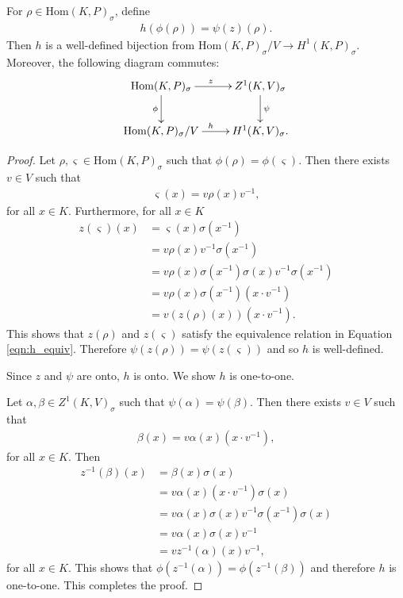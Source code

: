 \begin{lemma} \label{maph}
For $\rho \in \mathrm{Hom}(K, P)_\sigma$, define
\begin{align*}
h(\phi( \rho)) = \psi(z)(\rho).
\end{align*}
Then $h$ is a well-defined bijection from $\mathrm{Hom}(K, P)_\sigma / V \rightarrow H^1(K, P)_\sigma$. Moreover, the following diagram commutes:
  \begin{align*}
    \xymatrix{
    \mathrm{Hom}(K, P)_{\sigma} \ar[r]^z \ar[d]_\phi & Z^{1}(K, V)_\sigma \ar[d]^\psi \\
    \mathrm{Hom}(K, P)_{\sigma}/V \ar[r]^h & H^{1}(K, V)_\sigma.
    }
  \end{align*}
  \label{lem:v_h1}
\end{lemma}
\begin{proof}  
Let $\rho, \varsigma \in \mathrm{Hom}(K, P)_\sigma$ such that $\phi(\rho) = \phi(\varsigma)$. Then there exists $v \in V$ such that
\begin{align*} \varsigma(x) =  v\rho(x)v^{-1}, \end{align*}
for all $x \in K$. Furthermore, for all $x \in K$
\begin{align*}
z(\varsigma)(x) %
&= \varsigma(x)\sigma(x^{-1}) \\
&= v \rho(x) v^{-1} \sigma(x^{-1}) \\
&= v \rho(x) \sigma(x^{-1})\sigma(x) v^{-1} \sigma(x^{-1}) \\
&= v \rho(x) \sigma(x^{-1}) \left(x \cdot v^{-1}\right) \\
&= v \left(z(\rho)(x)\right) \left(x \cdot v^{-1}\right).
\end{align*}
This shows that $z(\rho)$ and $z(\varsigma)$ satisfy the equivalence relation in Equation \ref{eqn:h_equiv}. Therefore $\psi\left(z(\rho)\right) = \psi\left(z(\varsigma)\right)$ and so $h$ is well-defined.

Since $z$ and $\psi$ are onto, $h$ is onto. We show $h$ is one-to-one.

Let $\alpha, \beta \in Z^1(K, V)_\sigma$ such that $\psi(\alpha) = \psi(\beta)$. Then there exists $v \in V$ such that
\begin{align*} \beta(x) = v \alpha(x) \left(x \cdot v^{-1}\right), \end{align*}
for all $x \in K$. Then
\begin{align*}
z^{-1}(\beta)(x) 
&= \beta(x)\sigma(x) \\
&= v \alpha(x) \left(x \cdot v^{-1}\right) \sigma(x) \\
&= v \alpha(x) \sigma(x) v^{-1} \sigma(x^{-1}) \sigma(x) \\
&= v \alpha(x) \sigma(x) v^{-1} \\
&= v z^{-1}(\alpha)(x) v^{-1},
\end{align*}
for all $x \in K$.
This shows that $\phi\left(z^{-1}(\alpha)\right) = \phi\left(z^{-1}(\beta)\right)$ and therefore $h$ is one-to-one. This completes the proof.
\end{proof}

